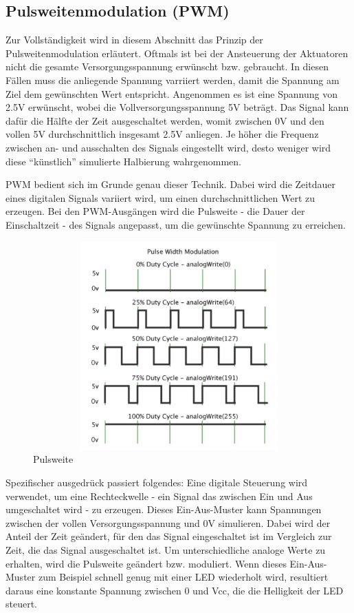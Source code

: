 \begin{enumerate}
\subsection{Pulsweitenmodulation (PWM)}\label{PWM}
Zur Vollständigkeit wird in diesem Abschnitt das Prinzip der Pulsweitenmodulation erläutert.
Oftmals ist bei der Ansteuerung der Aktuatoren nicht die gesamte Versorgungsspannung erwünscht bzw. gebraucht.
In diesen Fällen muss die anliegende Spannung varriiert werden, damit die Spannung am Ziel dem gewünschten Wert entspricht.
Angenommen es ist eine Spannung von 2.5V erwünscht, wobei die Vollversorgungsspannung 5V beträgt.
Das Signal kann dafür die Hälfte der Zeit ausgeschaltet werden, womit zwischen 0V und den vollen 5V durchschnittlich insgesamt 2.5V anliegen.
Je höher die Frequenz zwischen an- und ausschalten des Signals eingestellt wird, desto weniger wird diese ``künstlich'' simulierte Halbierung wahrgenommen.

\ac{PWM} bedient sich im Grunde genau dieser Technik.
Dabei wird die Zeitdauer eines digitalen Signals variiert wird, um einen durchschnittlichen Wert zu erzeugen.
Bei den \ac{PWM}-Ausgängen wird die Pulsweite - die Dauer der Einschaltzeit - des Signals angepasst, um die gewünschte Spannung zu erreichen.

\begin{figure}[htbp]
	\centering
	\includegraphics [width=13cm, height=8cm] {img/pulsweite}
	\caption{Pulsweite}
	\label{fig:pulsweite}
\end{figure}

Spezifischer ausgedrück passiert folgendes:
Eine digitale Steuerung wird verwendet, um eine Rechteckwelle - ein Signal das zwischen Ein und Aus umgeschaltet wird - zu erzeugen.
Dieses Ein-Aus-Muster kann Spannungen zwischen der vollen Versorgungsspannung und 0V simulieren.
Dabei wird der Anteil der Zeit geändert, für den das Signal eingeschaltet ist im Vergleich zur Zeit, die das Signal ausgeschaltet ist.
Um unterschiedliche analoge Werte zu erhalten, wird die Pulsweite geändert bzw. moduliert.
Wenn dieses Ein-Aus-Muster zum Beispiel schnell genug mit einer LED wiederholt wird, resultiert daraus eine konstante Spannung zwischen 0 und Vcc, die die Helligkeit der LED steuert.


\end{enumerate}
